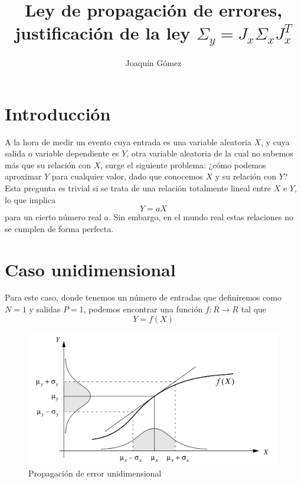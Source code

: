 \documentclass[a4paper, 10pt]{article}
\title{Ley de propagación de errores, justificación de la ley $\Sigma_y = J_x \Sigma_x J_x^{T}$}
\author{Joaquín Gómez}
\begin{document}
\maketitle
\pagebreak
\section{Introducción}
A la hora de medir un evento cuya entrada es una variable aleatoria $X$,
y cuya salida o variable dependiente es $Y$, otra variable aleatoria de
la cual no sabemos más que su relación con $X$, surge el siguiente
problema: ¿cómo podemos aproximar $Y$ para cualquier valor, dado que
conocemos $X$ y su relación con $Y$? Esta pregunta es trivial si se trata
de una relación totalmente lineal entre $X$ e $Y$, lo que implica
\begin{equation}
    Y=aX
\end{equation}
para un cierto número real $a$. Sin embargo, en el mundo real estas relaciones
no se cumplen de forma perfecta.

\section{Caso unidimensional}
Para este caso, donde tenemos un número de entradas que definiremos como $N=1$ y
salidas $P=1$, podemos encontrar una función $f:R\to R$ tal que
\begin{equation}
    Y = f(X)
\end{equation}

\begin{figure}[h]
    \includegraphics[width=\textwidth]{fig1.png}
    \caption{Propagación de error unidimensional}
\end{figure}
\end{document}
